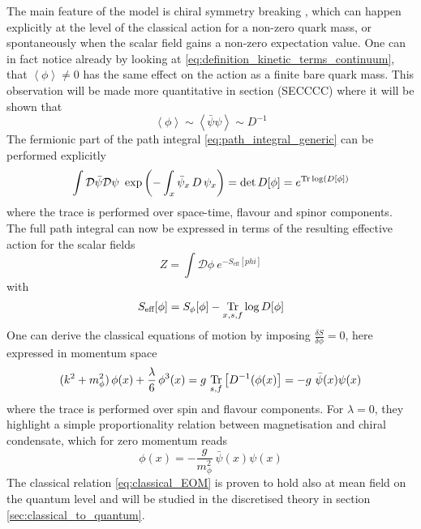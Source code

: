 The main feature of the model is chiral symmetry breaking \cite{Nambu1961DynamicalI, Nambu1961DynamicalII}, which can happen explicitly at the level of the classical action for a non-zero quark mass, or spontaneously when the scalar field gains a non-zero expectation value. One can in fact notice already by looking at \eqref{eq:definition_kinetic_terms_continuum}, that $\left\langle\phi\right\rangle \neq 0$ has the same effect on the action as a finite bare quark mass. This observation will be made more quantitative in section (SECCCC) where it will be shown that  
\begin{equation*}
    \left\langle \phi \right\rangle \sim \left\langle \bar \psi \psi \right\rangle \sim D^{-1}
\end{equation*}
The fermionic part of the path integral \eqref{eq:path_integral_generic} can be performed explicitly
\begin{equation*}
    \int \mathcal{D} \bar\psi \mathcal{D} \psi \ \exp\left( - \int_x \bar\psi_x \,  D \, \psi_x \right) = \text{det} \, D[\phi] = e^{\operatorname{\text{Tr}} \log (D[\phi])}
\end{equation*}
where the trace is performed over space-time, flavour and spinor components. \\ 
The full path integral can now be expressed in terms of the resulting effective action for the scalar fields
\begin{equation*}
    Z = \int \mathcal{D}\phi \ e^{-S_\text{eff}[phi]}
\end{equation*}
with
\begin{equation*}
    S_\text{eff}[\phi] = S_{\phi}[\phi] - \underset{x,s,f}{\operatorname{\text{Tr}}} \log D[\phi]
\end{equation*}
One can derive the classical equations of motion by imposing $\frac{\delta S}{\delta \phi} = 0$, here expressed in momentum space
\begin{equation*}
     (k^2 + m_\phi^2) \, \phi(x) + \frac{\lambda}{6} \, \phi^3(x) = g \ \underset{s,f}{\tr} \left[D^{-1}(\phi(x)\right] = - g \ \bar\psi(x) \psi(x)
\end{equation*}
where the trace is performed over spin and flavour components. For $\lambda = 0$, they highlight a simple proportionality relation between magnetisation and chiral condensate, which for zero momentum reads
\begin{equation}
    \phi(x) = - \frac{g}{m_\phi^2} \ \bar \psi(x) \psi(x)
    \label{eq:classical_EOM}
\end{equation}
The classical relation \eqref{eq:classical_EOM} is proven to hold also at mean field on the quantum level \cite{Buballa2005NJL-modelMatter} and will be studied in the discretised theory in section \ref{sec:classical_to_quantum}. \\~\\


